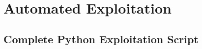 \documentclass[11pt,letterpaper]{article}
\begin{document}
\section{Automated Exploitation}

\subsection{Complete Python Exploitation Script}

\par\noindent\begin{minipage}{\linewidth}
\captionsetup{hypcap=false}%
\end{minipage}\par\nopagebreak
\end{document}
